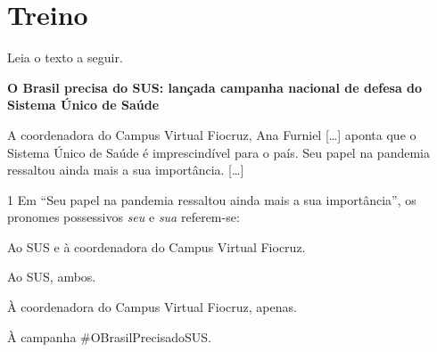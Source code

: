\section*{Treino}

Leia o texto a seguir.

\begin{myquote}
\begin{center}
\textbf{O Brasil precisa do SUS: lançada campanha nacional de defesa do
Sistema Único de Saúde}\\
\end{center}

\medskip

\noindent A coordenadora do Campus Virtual Fiocruz, Ana Furniel {[}\ldots{]}
aponta que o Sistema Único de Saúde é imprescindível para o país. Seu
papel na pandemia ressaltou ainda mais a sua importância. {[}\ldots{]}

\end{myquote}

\num{1} Em ``Seu papel na pandemia ressaltou ainda mais a sua importância'', os
pronomes possessivos \emph{seu} e \emph{sua} referem-se:

\begin{escolha}
\item Ao SUS e à coordenadora do Campus Virtual Fiocruz.
\item Ao SUS, ambos.
\item À coordenadora do Campus Virtual Fiocruz, apenas.
\item À campanha \#OBrasilPrecisadoSUS.
\end{escolha}




